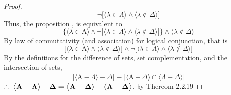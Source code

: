 \documentclass[a4paper, 12pt]{article}
\theoremstyle{plain}
\begin{document}
\begin{proof}
\begin{equation*}
        \lnot \bigg[
            \Big \langle \lambda \in \Lambda \Big \rangle
                \land
            \Big \langle \lambda \notin \Delta \Big \rangle
        \bigg]
    \end{equation*}
    Thus, the proposition
    ,
    is equivalent to
    \begin{equation*} %
        \Bigg\{
        \Big \langle \lambda \in \mathrm{A} \Big \rangle
            \land
        \lnot \bigg[
            \Big \langle \lambda \in \Lambda \Big \rangle
                \land
            \Big \langle \lambda \notin \Delta \Big \rangle
        \bigg]
        \Bigg\}
            \land
        \Big \langle \lambda \notin \Delta \Big \rangle
    \end{equation*}
    By law of commutativity (and association) for logical conjunction, 
    that is
    \begin{equation*} %
        \bigg[
            \Big \langle \lambda \in \mathrm{A} \Big \rangle
                \land
            \Big \langle \lambda \notin \Delta \Big \rangle
        \bigg]
            \land
        \lnot \bigg[
            \Big \langle \lambda \in \Lambda \Big \rangle
                \land
            \Big \langle \lambda \notin \Delta \Big \rangle
        \bigg]
    \end{equation*}
    By the definitions for the difference of sets, set complementation,
    and the intersection of sets,
    \begin{equation*} %
        \bigg[
        \Big \langle \mathrm{A} - \Lambda \Big \rangle - \Delta
        \bigg]
            \equiv
        \bigg[
        \Big \langle \mathrm{A} - \Delta \Big \rangle
            \cap
        \overline{
            \Big \langle \Lambda - \Delta \Big \rangle
        }
        \bigg]
    \end{equation*}
    $\therefore \text{\space} \bm{
    \big \langle \mathrm{A} - \Lambda \big \rangle - \Delta 
        = 
    \big \langle \mathrm{A} - \Delta \big \rangle 
        - 
    \big \langle \Lambda - \Delta \big \rangle
    }$, by Thereom 2.2.19

\color{lightgray} \end{proof}
\pagebreak
\end{document}
